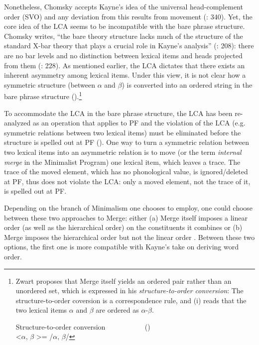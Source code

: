 \largerpage%
Nonetheless, Chomsky accepts Kayne’s idea of the universal head-complement order (\acs{SVO}) and any deviation from this results from movement (\citeyear{Chomsky1995}: 340). Yet, the core idea of the \ac{LCA} seems to be incompatible with the bare phrase structure. Chomsky writes, ``the bare theory structure lacks much of the structure of the standard X-bar theory that plays a crucial role in Kayne’s analysis'' (\citeyear{Chomsky2015}: 208): there are no bar levels and no distinction between lexical items and heads projected from them (\citeyear{Chomsky2015}: 228). As mentioned earlier, the \ac{LCA} dictates that there exists an inherent asymmetry among lexical items. Under this view, it is not clear how a symmetric structure (between ${\alpha}$ and ${\beta}$) is converted into an ordered string in the bare phrase structure (\citealt{Zwart2011}).\footnote{Zwart proposes that Merge itself yields an ordered pair rather than an unordered set, which is expressed in his \textit{structure-to-order conversion}: The structure-to-order coversion is a correspondence rule, and (i) reads that the two lexical items ${\alpha}$ and ${\beta}$ are ordered as ${\alpha}$-${\beta}$.

\ea  Structure-to-order conversion ~~~~~~~~~~ (\citealt[101]{Zwart2011}) \\
\textless ${\alpha}$, ${\beta}$ \textgreater = /${\alpha}$, ${\beta}$/
\zlast
} 

To accommodate the \ac{LCA} in the bare phrase structure, the \ac{LCA} has been re-analyzed as an operation that applies to \ac{PF} and the violation of the \ac{LCA} (e.g. symmetric relations between two lexical items) must be eliminated before the structure is spelled out at \ac{PF} (\citealt{Chomsky1995,Moro2000}). One way to turn a symmetric relation between two lexical items into an asymmetric relation is to move (or the term \textit{internal merge} in the Minimalist Program) one lexical item, which leaves a trace. The trace of the moved element, which has no phonological value, is ignored/deleted at \ac{PF}, thus does not violate the \ac{LCA}: only a moved element, not the trace of it, is spelled out at \ac{PF}. 


Depending on the branch of Minimalism one chooses to employ, one could choose between these two approaches to Merge: either (a) Merge itself imposes a linear order (as well as the hierarchical order) on the constituents it combines or (b) Merge imposes the hierarchical order but not the linear order \citep{OsborneEtAl2011}. Between these two options, the first one is more compatible with Kayne’s take on deriving word order.

